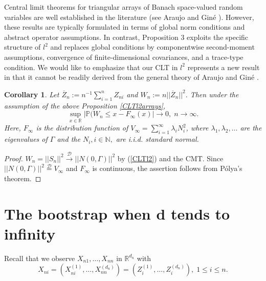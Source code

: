 \documentclass[sn-mathphys,Numbered]{sn-jnl}%
\theoremstyle{thmstyleone}%
\theoremstyle{thmstyletwo}%
\newtheorem{corollary}{Corollary}%
\theoremstyle{thmstylethree}%
\begin{document}
Central limit theorems for triangular arrays of Banach space-valued random variables are well established in the literature (see Araujo and Gin\'{e} \cite{Araujo}). However, these results are typically formulated in terms of global norm conditions and abstract operator assumptions. In contrast, Proposition 3 exploits the specific structure of $l^2$
and replaces global conditions by componentwise second-moment assumptions, convergence of finite-dimensional covariances, and a trace-type condition.
We would like to emphasize that our CLT in $l^2$ represents a new result in that it cannot be readily derived from the general theory of Araujo and Gin\'{e} \cite{Araujo}.\\


\begin{corollary} \label{normZnquer} Let $\overline{Z}_n := n^{-1} \sum_{i=1}^n Z_{ni}$ and $W_n:=n||\overline{Z}_n||^2.$ Then under the assumption of the above Proposition \ref{CLTl2arrays},
\begin{equation} \label{Vnpn}
 \sup_{x \in \mathbb{R}}|\mathbb{P}(W_n \le x - F_\infty(x)| \rightarrow 0, \; n \rightarrow \infty.
\end{equation}
Here, $F_\infty$ is the distribution function of $V_\infty = \sum_{i=1}^\infty \lambda_i N_i^2$, where $\lambda_1,\lambda_2,\ldots$ are the eigenvalues of $\Gamma$ and the $N_i, i \in \mathbb{N},$ are i.i.d. standard normal.
\end{corollary}

\begin{proof} $W_n=||S_n||^2 \stackrel{\mathcal{D}}{\rightarrow} ||N(0,\Gamma)||^2$ by (\ref{CLTl2}) and the CMT. Since $||N(0,\Gamma)||^2 \stackrel{\mathcal{D}}{=} V_\infty$ and $F_\infty$ is continuous, the assertion follows from P\'{o}lya's theorem.
\end{proof}

\section{The bootstrap when d tends to infinity}
Recall that we observe $X_{n1},\ldots,X_{nn}$ in $\mathbb{R}^{d_n}$ with
$$
 X_{ni}= (X_{ni}^{(1)},\ldots,X_{nn}^{(d_n)}) = (Z_i^{(1)},\ldots,Z_i^{(d_n)}), \; 1 \le i \le n.
$$
\end{document}
